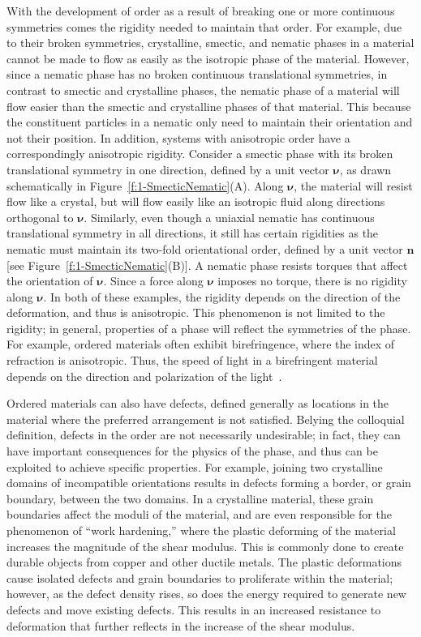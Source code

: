 With the development of order as a result of breaking one or more continuous symmetries comes the rigidity needed to maintain that order.
For example, due to their broken symmetries, crystalline, smectic, and nematic phases in a material cannot be made to flow as easily as the isotropic phase of the material.
However, since a nematic phase has no broken continuous translational symmetries, in contrast to smectic and crystalline phases, the nematic phase of a material will flow easier than the smectic and crystalline phases of that material.
This because the constituent particles in a nematic only need to maintain their orientation and not their position.
In addition, systems with anisotropic order have a correspondingly anisotropic rigidity.
Consider a smectic phase with its broken translational symmetry in one direction, defined by a unit vector $\bm{\nu}$, as drawn schematically in Figure~\ref{f:1-SmecticNematic}(A).
Along $\bm{\nu}$, the material will resist flow like a crystal, but will flow easily like an isotropic fluid along directions orthogonal to $\bm{\nu}$.
Similarly, even though a uniaxial nematic has continuous translational symmetry in all directions, it still has certain rigidities as the nematic must maintain its two-fold orientational order, defined by a unit vector $\bm{n}$ [see Figure~\ref{f:1-SmecticNematic}(B)].
A nematic phase resists torques that affect the orientation of $\bm{\nu}$. Since a force along $\bm{\nu}$ imposes no torque, there is no rigidity along $\bm{\nu}$.
In both of these examples, the rigidity depends on the direction of the deformation, and thus is anisotropic.
This phenomenon is not limited to the rigidity; in general, properties of a phase will reflect the symmetries of the phase.
For example, ordered materials often exhibit birefringence, where the index of refraction is anisotropic.
Thus, the speed of light in a birefringent material depends on the direction and polarization of the light~\cite{RN175}.

Ordered materials can also have defects, defined generally as locations in the material where the preferred arrangement is not satisfied.
Belying the colloquial definition, defects in the order are not necessarily undesirable; in fact, they can have important consequences for the physics of the phase, and thus can be exploited to achieve specific properties.
For example, joining two crystalline domains of incompatible orientations results in defects forming a border, or grain boundary, between the two domains.
In a crystalline material, these grain boundaries affect the moduli of the material, and are even responsible for the phenomenon of ``work hardening,'' where the plastic deforming of the material increases the magnitude of the shear modulus.
This is commonly done to create durable objects from copper and other ductile metals.
The plastic deformations cause isolated defects and grain boundaries to proliferate within the material; however, as the defect density rises, so does the energy required to generate new defects and move existing defects.
This results in an increased resistance to deformation that further reflects in the increase of the shear modulus.

